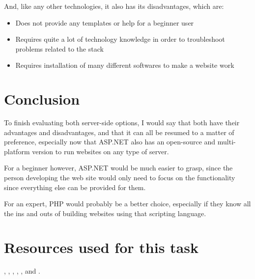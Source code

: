 And, like any other technologies, it also has its disadvantages, which are:
\begin{itemize}
  \item Does not provide any templates or help for a beginner user
  \item Requires quite a lot of technology knowledge in order to troubleshoot
  problems related to the stack
  \item Requires installation of many different softwares to make a website work
\end{itemize}

\section{Conclusion}
To finish evaluating both server-side options, I would say that both have their advantages and disadvantages, and that it can all be resumed to a matter of preference, especially now that ASP.NET also has an open-source and multi-platform version to run websites on any type of server.

For a beginner however, ASP.NET would be much easier to grasp, since the person developing the web site would only need to focus on the functionality since everything else can be provided for them.

For an expert, PHP would probably be a better choice, especially if they know all the ins and outs of building websites using that scripting language.

\section{Resources used for this task}
\cite{aspOverview},
\cite{aspCompilationOverview},
\cite{aspAdvantages},
\cite{phpIntro},
\cite{phpInstallConfig}, and
\cite{serverSideComparison}.
